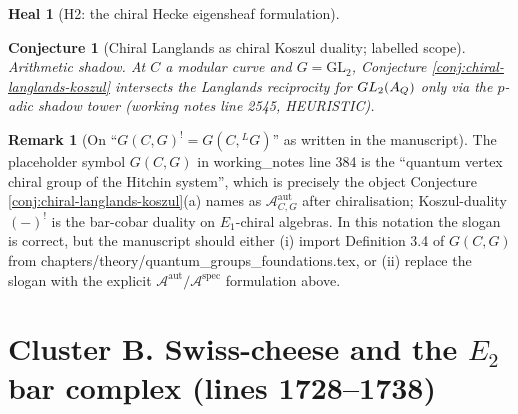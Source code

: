 \documentclass[11pt]{amsart}
\newtheorem{conjecture}[theorem]{Conjecture}
\theoremstyle{definition}
\newtheorem{heal}[attack]{Heal}
\newtheorem{remark}{Remark}
\providecommand{\Eone}{E_1}
\providecommand{\Etwo}{E_2}
\providecommand{\LG}{{}^L G}
\begin{document}
\begin{heal}[H2: the chiral Hecke eigensheaf formulation]
\begin{conjecture}[Chiral Langlands as chiral Koszul duality; labelled scope]
\noindent\emph{Arithmetic shadow.} At $C$ a modular curve and
$G = \mathrm{GL}_2$, Conjecture \ref{conj:chiral-langlands-koszul}
intersects the Langlands reciprocity for $GL_2(A_{Q})$
only via the $p$-adic shadow tower (working notes line 2545,
HEURISTIC).
\end{conjecture}

\begin{remark}[On ``$G(C,G)^! = G(C, \LG)$'' as written in the manuscript]
The placeholder symbol $G(C,G)$ in working\_notes line 384 is the
``quantum vertex chiral group of the Hitchin system'', which is
precisely the object Conjecture \ref{conj:chiral-langlands-koszul}(a)
names as $\mathcal{A}^{\mathrm{aut}}_{C,G}$ after chiralisation;
Koszul-duality $(-)^!$ is the bar-cobar duality on
$\Eone$-chiral algebras. In this notation the slogan is correct, but
the manuscript should either (i) import Definition 3.4 of $G(C,G)$
from chapters/theory/quantum\_groups\_foundations.tex, or (ii) replace
the slogan with the explicit $\mathcal{A}^{\mathrm{aut}}/\mathcal{A}^{\mathrm{spec}}$
formulation above.
\end{remark}
\end{heal}

\section{Cluster B. Swiss-cheese and the $\Etwo$ bar complex (lines 1728--1738)}
\end{document}
